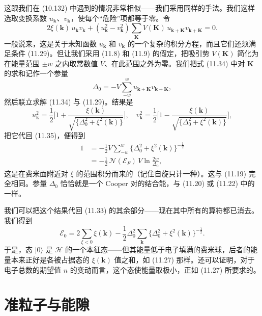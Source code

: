 这跟我们在 (10.132) 中遇到的情况非常相似——我们采用同样的手法。我们这样选取变换系数 $u_{\mathbf{k}}$、$v_{\mathbf{k}}$，使每个“危险”项都等于零。令
\begin{equation*}
2\xi(\mathbf{k})\,u_{\mathbf{k}}v_{\mathbf{k}}+(u^{2}_{\mathbf{k}}-v^{2}_{\mathbf{k}})\sum_{\mathbf{K}}V(\mathbf{K})\,u_{\mathbf{k}+\mathbf{K}}v_{\mathbf{k}+\mathbf{K}}=0.
\tag{11.34}
\end{equation*}
一般说来，这是关于未知函数 $u_{\mathbf{k}}$ 和 $v_{\mathbf{k}}$ 的一个复杂的积分方程，而且它们还须满足条件 (11.29)。但让我们采用 (11.8) 和 (11.9) 的假定，把吸引势 $V(\mathbf{K})$ 简化为在能量范围 $\pm w$ 之内取常数值 $V$、在此范围之外为零。我们把式 (11.34) 中对 $\mathbf{K}$ 的求和记作一个参量
\begin{equation*}
\Delta_{0}=-V\sum_{-w}^{w}u_{\mathbf{k}+\mathbf{K}}v_{\mathbf{k}+\mathbf{K}},
\tag{11.35}
\end{equation*}
然后联立求解 (11.34) 与 (11.29)。结果是
\begin{equation*}
u^{2}_{\mathbf{k}}=\frac{1}{2}\biggl[1+\frac{\xi(\mathbf{k})}{\sqrt{\{\Delta^{2}_{0}+\xi^{2}(\mathbf{k})\}}}\biggr],\quad v^{2}_{\mathbf{k}}=\frac{1}{2}\biggl[1-\frac{\xi(\mathbf{k})}{\sqrt{\{\Delta^{2}_{0}+\xi^{2}(\mathbf{k})\}}}\biggr],
\tag{11.36}
\end{equation*}
把它代回 (11.35)，便得到
\begin{align*}
1&=-\frac{1}{2}V\sum_{-w}^{w}\{\Delta^{2}_{0}+\xi^{2}(\mathbf{k})\}^{-\frac{1}{2}}\\
&=-\frac{1}{2}\,\mathcal{N}(\mathcal{E}_{F})\,V\ln\frac{2w}{\Delta_{0}},
\tag{11.37}
\end{align*}
这是在费米面附近对 $\xi$ 的范围积分而来的（记住自旋只计一种）。这与 (11.19) 完全相同。参量 $\Delta_{0}$ 恰恰就是一个 Cooper 对的结合能，与 (11.20) 或 (11.22) 中的一样。

我们可以把这个结果代回 (11.33) 的其余部分——现在其中所有的算符都已消去。我们得到
\begin{equation*}
\mathcal{E}_{0}=2\sum_{\xi<0}\xi(\mathbf{k})-\frac{1}{2}\Delta^{2}_{0}\sum_{\mathbf{k}}\{\Delta^{2}_{0}+\xi^{2}(\mathbf{k})\}^{-\frac{1}{2}}.
\tag{11.38}
\end{equation*}
于是，态 $|0\rangle$ 是 $\mathcal{H}$ 的一个本征态——但其能量低于电子填满的费米球，后者的能量本来正好是各被占据态的 $\xi(\mathbf{k})$ 值之和，如 (11.27) 那样。还可以证明，对于电子总数的期望值 $n$ 的变动而言，这个态使能量取极小，正如 (11.27) 所要求的。

\section{准粒子与能隙}


